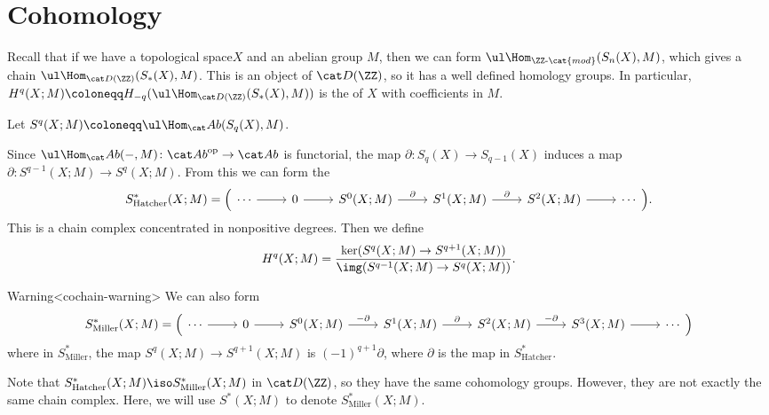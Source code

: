 \documentclass{standalone}
\begin{document}
\section{Cohomology}
Recall that if we have a topological space\(X\)
and an abelian group \(M\), then we can form
\(\ul\Hom_{\ZZ\text{-}\cat{mod}}(S_n(X), M)\), %
which gives a chain \(\ul\Hom_{\der(\ZZ)}(S_*(X), M)\).
This is an object of \(\der(\ZZ)\),
so it has a well defined homology groups.
In particular, \(H^q(X; M) \coloneqq H_{-q}(\ul\Hom_{\der(\ZZ)}(S_*(X), M))\)
is the  of \(X\) with coefficients in \(M\).

\begin{definition}
  Let \(S^q(X; M) \coloneqq \ul\Hom_\cAb(S_q(X), M)\).
\end{definition}
Since \(\ul\Hom_\cAb({-}, M) \colon \cAb^\op \to \cAb\) is functorial,
the map \(\partial \colon S_q(X) \to S_{q-1}(X)\) induces a map
\(\partial \colon S^{q-1}(X; M) \to S^q(X; M)\).
From this we can form the 
\[
  S^*_{\text{Hatcher}}(X; M) = \Big(\begin{tikzcd}
  	\cdots \ar[r] &
  		0 \ar[r] &
  		S^0(X; M) \ar[r, "\partial"] &
  		S^1(X; M) \ar[r, "\partial"] &
  		S^2(X; M) \ar[r] &
  		\cdots
  \end{tikzcd}
  \Big).
\]
This is a chain complex concentrated in nonpositive degrees.
Then we define
\[
  H^q(X; M) = \frac{\ker (S^q(X; M) \to S^{q+1}(X; M))}
                   {\img (S^{q-1}(X; M) \to S^q(X; M))}.
\]

\begin{adhoctheorem}{Warning}<cochain-warning>
  We can also form
  \[
    S^*_{\text{Miller}}(X; M) = \Big(\begin{tikzcd}
      \cdots \ar[r] &
        0 \ar[r] &
        S^0(X; M) \ar[r, "-\partial"] &
        S^1(X; M) \ar[r, "\partial"] &
        S^2(X; M) \ar[r, "-\partial"] &
        S^3(X; M) \ar[r] &
        \cdots
    \end{tikzcd}
    \Big)
  \]
  where in \(S^*_{\text{Miller}}\),
  the map \(S^q(X; M) \to S^{q+1}(X; M)\) is \((-1)^{q+1} \partial\),
  where \(\partial\) is the map in \(S^*_{\text{Hatcher}}\).
\end{adhoctheorem}

Note that \(S^*_{\text{Hatcher}}(X; M) \iso S^*_{\text{Miller}}(X; M)\)
in \(\der(\ZZ)\), so they have the same cohomology groups.
However, they are not exactly the same chain complex.
Here, we will use \(S^*(X; M)\) to denote \(S^*_{\text{Miller}}(X; M)\).
\end{document}
